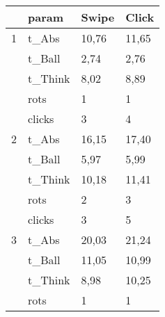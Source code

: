 
    \begin{tabular}{|c|l|ll|}
    \hline
    \rowcolor[rgb]{ .651,  .651,  .651} \multicolumn{1}{|l|}{lvl} & param & \multicolumn{1}{c}{Swipe} & \multicolumn{1}{c|}{Click} \bigstrut\\
    \hline
    \rowcolor[rgb]{ .851,  .851,  .851} 1     & t\_Abs & \cellcolor[rgb]{ 1,  1,  1}10,76 & \cellcolor[rgb]{ 1,  1,  1}11,65 \bigstrut[t]\\
    \rowcolor[rgb]{ .851,  .851,  .851}       & t\_Ball & \cellcolor[rgb]{ 1,  1,  1}2,74 & \cellcolor[rgb]{ 1,  1,  1}2,76 \\
    \rowcolor[rgb]{ .851,  .851,  .851}       & t\_Think & \cellcolor[rgb]{ 1,  1,  1}8,02 & \cellcolor[rgb]{ 1,  1,  1}8,89 \\
    \rowcolor[rgb]{ .851,  .851,  .851}       & rots  & \cellcolor[rgb]{ 1,  1,  1}1 & \cellcolor[rgb]{ 1,  1,  1}1 \\
    \rowcolor[rgb]{ .851,  .851,  .851}       & clicks & \cellcolor[rgb]{ 1,  1,  1}3 & \cellcolor[rgb]{ 1,  1,  1}4 \bigstrut[b]\\
    \hline
    \rowcolor[rgb]{ .851,  .851,  .851} 2     & t\_Abs & \cellcolor[rgb]{ 1,  1,  1}16,15 & \cellcolor[rgb]{ 1,  1,  1}17,40 \bigstrut[t]\\
    \rowcolor[rgb]{ .851,  .851,  .851}       & t\_Ball & \cellcolor[rgb]{ 1,  1,  1}5,97 & \cellcolor[rgb]{ 1,  1,  1}5,99 \\
    \rowcolor[rgb]{ .851,  .851,  .851}       & t\_Think & \cellcolor[rgb]{ 1,  1,  1}10,18 & \cellcolor[rgb]{ 1,  1,  1}11,41 \\
    \rowcolor[rgb]{ .851,  .851,  .851}       & rots  & \cellcolor[rgb]{ 1,  1,  1}2 & \cellcolor[rgb]{ 1,  1,  1}3 \\
    \rowcolor[rgb]{ .851,  .851,  .851}       & clicks & \cellcolor[rgb]{ 1,  1,  1}3 & \cellcolor[rgb]{ 1,  1,  1}5 \bigstrut[b]\\
    \hline
    \rowcolor[rgb]{ .851,  .851,  .851} 3     & t\_Abs & \cellcolor[rgb]{ 1,  1,  1}20,03 & \cellcolor[rgb]{ 1,  1,  1}21,24 \bigstrut[t]\\
    \rowcolor[rgb]{ .851,  .851,  .851}       & t\_Ball & \cellcolor[rgb]{ 1,  1,  1}11,05 & \cellcolor[rgb]{ 1,  1,  1}10,99 \\
    \rowcolor[rgb]{ .851,  .851,  .851}       & t\_Think & \cellcolor[rgb]{ 1,  1,  1}8,98 & \cellcolor[rgb]{ 1,  1,  1}10,25 \\
    \rowcolor[rgb]{ .851,  .851,  .851}       & rots  & \cellcolor[rgb]{ 1,  1,  1}1 & \cellcolor[rgb]{ 1,  1,  1}1 \\

\end{tabular}
